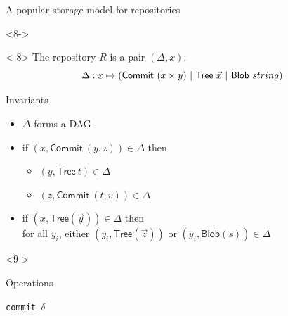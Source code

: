 \documentclass[ignorenonframetext,red]{beamer}
\begin{document}
\begin{frame}{A popular storage model for repositories}
\begin{onlyenv}
\begin{center}
    \end{center}
  \end{onlyenv}
  \begin{onlyenv}<8->
    \begin{onlyenv}<-8>
      The repository $R$ is a pair $(\Delta, x)$:
      \[ \Delta : x \mapsto (\mathsf{Commit}\ (x\times y) \gor \mathsf{Tree}\ \vec x
      \gor \mathsf{Blob}\ string)\]
      \begin{block}{Invariants}
        \begin{itemize}
        \item $\Delta$ forms a DAG
        \item if $(x, \mathsf{Commit}\ (y,z)) \in\Delta$ then
          \begin{itemize}
          \item $(y, \mathsf{Tree}\ t)\in\Delta$
          \item $(z, \mathsf{Commit}\ (t,v))\in\Delta$
          \end{itemize}
        \item if $(x, \mathsf{Tree}(\vec y))\in\Delta$ then \\
          for all $y_i$, either $(y_i, \mathsf{Tree}(\vec z))$ or
          $(y_i, \mathsf{Blob}(s))\in\Delta$
        \end{itemize}
      \end{block}
    \end{onlyenv}
    \begin{onlyenv}<9->
      \begin{block}{Operations}
        \begin{description}
        \item[\texttt{commit $\delta$}]

\end{description}
\end{block}
\end{onlyenv}
\end{onlyenv}
\end{frame}
\end{document}
